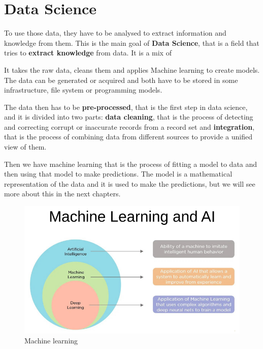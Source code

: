 \section{Data Science}
To use those data, they have to be analysed to extract information and
knowledge from them. This is the main goal of \textbf{Data Science}, that is a
field that tries to \textbf{extract knowledge} from data. It is a mix of

It takes the raw data, cleans them and applies Machine learning to create
models. The data can be generated or acquired and both have to be stored
in some infrastructure, file system or programming models. 

The data then has to be \textbf{pre-processed}, that is the first step in
data science, and it is divided into two parts: \textbf{data cleaning},
that is the process of detecting and correcting corrupt or inaccurate
records from a record set and \textbf{integration}, that is the process of
combining data from different sources to provide a unified view of them.

Then we have machine learning that is the process of fitting a model to 
data and then using that model to make predictions. The model is a 
mathematical representation of the data and it is used to make 
the predictions, but we will see more about this in the next chapters.

\begin{figure}[H]
    \centering
    \includegraphics[scale=0.5]{images/Introduction/Intro2.png}
    \caption{Machine learning}
    \label{fig:enter-label}
\end{figure}
